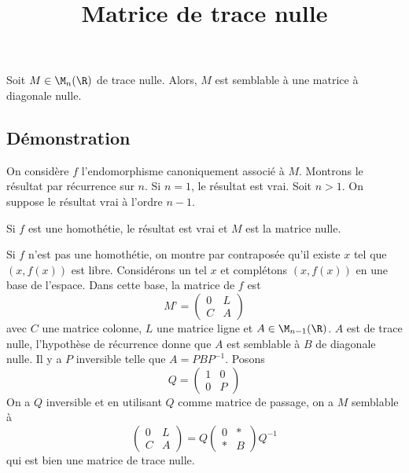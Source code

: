\documentclass[fontsize=12pt,twoside=false,parskip=half, french]{scrartcl}
\title{Matrice de trace nulle}
\date{}
\author{}
\begin{document}
\maketitle
   \begin{Theoreme}
      Soit $M \in \M_n(\R)$ de trace nulle. Alors, $M$ est semblable à une matrice à diagonale nulle.
   \end{Theoreme}
   \subsection{Démonstration}
      On considère $f$ l’endomorphisme canoniquement associé à $M$.
      Montrons le résultat par récurrence sur $n$. Si $n = 1$, le résultat est vrai.
      Soit $n > 1$. On suppose le résultat vrai à l’ordre $n - 1$.
      
      Si $f$ est une homothétie, le résultat est vrai et $M$ est la matrice nulle.
      
      Si $f$ n’est pas une homothétie, on montre par contraposée qu’il existe $x$ tel que $(x, f(x))$ est libre. 
      Considérons un tel $x$ et complétons $(x, f(x))$ en une base
      de l’espace. Dans cette base, la matrice de $f$ est
      \[
         M’ = 
         \begin{pmatrix}
            0 & L\\
            C & A
         \end{pmatrix}
      \]
      avec $C$ une matrice colonne, $L$ une matrice ligne et $A \in \M_{n - 1}(\R)$. $A$ est de trace nulle,
      l’hypothèse de récurrence donne que $A$ est semblable à $B$ de diagonale nulle. Il y a $P$ inversible telle que $A = PBP^{-1}$. Posons
      \[
         Q = 
         \begin{pmatrix}
           1 & 0\\
           0 & P
         \end{pmatrix}
      \]
      On a $Q$ inversible et en utilisant $Q$ comme matrice de passage, on a $M$ semblable à
      \[
         \begin{pmatrix}
            0 & L\\
            C & A
         \end{pmatrix} = Q \begin{pmatrix}
         0  & *\\
         * & B
         \end{pmatrix} Q^{-1}        
      \]
      qui est bien une matrice de trace nulle.
\end{document}
